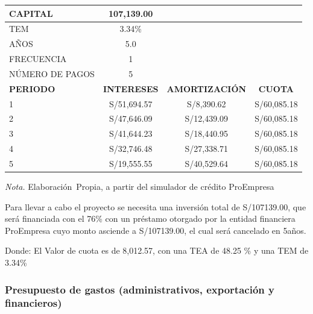 \documentclass[
  stu,
  floatsintext,
  longtable,
  a4paper,
  nolmodern,
  notxfonts,
  notimes,
  12pt,
  colorlinks=true,linkcolor=blue,citecolor=blue,urlcolor=blue]{apa7}
\newcounter{none} %
\begin{document}
\begin{table}

{\caption{{Tabla de Amortizaciones}{\label{tbl-mytable2}}}}

{\def\LTcaptype{none} %
\begin{longtable}[]{@{}lccc@{}}
\toprule\noalign{}
CAPITAL & 107,139.00 & & \\
\midrule\noalign{}
\endhead
\bottomrule\noalign{}
\endlastfoot
TEM & 3.34\% & & \\
AÑOS & 5.0 & & \\
FRECUENCIA & 1 & & \\
NÚMERO DE PAGOS & 5 & & \\
\textbf{PERIODO} & \textbf{INTERESES} & \textbf{AMORTIZACIÓN} &
\textbf{CUOTA} \\
1 & S/51,694.57 & S/8,390.62 & S/60,085.18 \\
2 & S/47,646.09 & S/12,439.09 & S/60,085.18 \\
3 & S/41,644.23 & S/18,440.95 & S/60,085.18 \\
4 & S/32,746.48 & S/27,338.71 & S/60,085.18 \\
5 & S/19,555.55 & S/40,529.64 & S/60,085.18 \\
\end{longtable}
}

\noindent \emph{Nota.} Elaboración~Propia, a partir del simulador de
crédito ProEmpresa

\end{table}

Para llevar a cabo el proyecto se necesita una inversión total de
S/107139.00, que será financiada con el 76\% con un préstamo otorgado
por la entidad financiera ProEmpresa cuyo monto asciende a S/107139.00,
el cual será cancelado en 5años.

Donde: El Valor de cuota es de 8,012.57, con una TEA de 48.25 \% y una
TEM de 3.34\%

\subsubsection{Presupuesto de gastos (administrativos, exportación y
financieros)}\label{presupuesto-de-gastos-administrativos-exportaciuxf3n-y-financieros}
\end{document}
